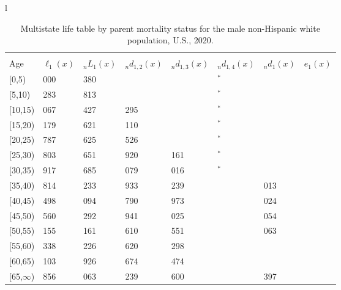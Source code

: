 \documentclass[
]{article}
\begin{document}
\begin{table}
\caption{\label{tab:table-nhwhite-male}Multistate life table by parent mortality status for the male non-Hispanic white population, U.S., 2020.}

\centering
\fontsize{9}{11}\selectfont
\begin{tabular}[t]{l}
\hline
\begin{tabular}{>{\raggedright\arraybackslash}p{.45in}>{\raggedleft\arraybackslash}p{.65in}>{\raggedleft\arraybackslash}p{.65in}>{\raggedleft\arraybackslash}p{.65in}>{\raggedleft\arraybackslash}p{.65in}>{\raggedleft\arraybackslash}p{.65in}>{\raggedleft\arraybackslash}p{.65in}>{\raggedleft\arraybackslash}p{.65in}}
\toprule
\multicolumn{1}{c}{ } & \multicolumn{7}{c}{(1) Lost neither} \\
\cmidrule(l{3pt}r{3pt}){2-8}
Age & $\ell_{1}(x)$ & ${}_nL_{1}(x)$ & ${}_nd_{1,2}(x)$ & ${}_nd_{1,3}(x)$ & ${}_nd_{1,4}(x)$ & ${}_nd_{1}(x)$ & $e_{1}(x)$\\
\midrule
{}[0,5) & 100 000 & 495 380 & 744 & 364 & 37$^{*}$ & 572 & 44\\
{}[5,10) & 98 283 & 488 813 & 852 & 296 & 9$^{*}$ & 58 & 39\\
{}[10,15) & 97 067 & 481 427 & 1 295 & 484 & 11$^{*}$ & 97 & 34\\
{}[15,20) & 95 179 & 468 621 & 2 110 & 939 & 24$^{*}$ & 320 & 29\\
{}[20,25) & 91 787 & 448 625 & 2 526 & 837 & 26$^{*}$ & 595 & 25\\
\addlinespace
{}[25,30) & 87 803 & 423 651 & 2 920 & 1 161 & 20$^{*}$ & 783 & 20\\
{}[30,35) & 82 917 & 390 685 & 4 079 & 2 016 & 58$^{*}$ & 951 & 16\\
{}[35,40) & 75 814 & 348 233 & 4 933 & 2 239 & 131 & 1 013 & 12\\
{}[40,45) & 67 498 & 292 094 & 6 790 & 2 973 & 151 & 1 024 & 9\\
{}[45,50) & 56 560 & 228 292 & 6 941 & 3 025 & 384 & 1 054 & 6\\
\addlinespace
{}[50,55) & 45 155 & 158 161 & 7 610 & 3 551 & 593 & 1 063 & 3\\
{}[55,60) & 32 338 & 93 226 & 6 620 & 3 298 & 369 & 948 & 2\\
{}[60,65) & 21 103 & 40 926 & 4 674 & 2 474 & 493 & 606 & 1\\
{}[65,$\infty$) & 12 856 & 24 063 & 3 239 & 1 600 & 596 & 1 397 & 0\\
\end{tabular}\\

\end{tabular}
\end{table}
\end{document}
